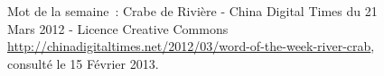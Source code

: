\begin{figure}[ht]
    \centering
    



    \caption[Hexie]{ Mot de la semaine : Crabe de Rivière - China Digital Times du 21 Mars 2012 - Licence Creative Commons \url{http://chinadigitaltimes.net/2012/03/word-of-the-week-river-crab}, consulté le 15 Février 2013.}

\label{fig:hexie}
\end{figure}


